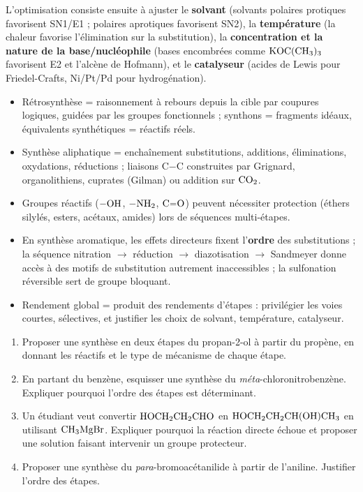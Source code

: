 \documentclass[11pt]{article}
\begin{document}
L'optimisation consiste ensuite à ajuster le \textbf{solvant} (solvants polaires protiques favorisent SN1/E1 ; polaires aprotiques favorisent SN2), la \textbf{température} (la chaleur favorise l'élimination sur la substitution), la \textbf{concentration et la nature de la base/nucléophile} (bases encombrées comme $\ce{KOC(CH3)3}$ favorisent E2 et l'alcène de Hofmann), et le \textbf{catalyseur} (acides de Lewis pour Friedel-Crafts, Ni/Pt/Pd pour hydrogénation).

\begin{aretenir}
\begin{itemize}
\item Rétrosynthèse = raisonnement à rebours depuis la cible par coupures logiques, guidées par les groupes fonctionnels ; synthons = fragments idéaux, équivalents synthétiques = réactifs réels.
\item Synthèse aliphatique = enchaînement substitutions, additions, éliminations, oxydations, réductions ; liaisons C$-$C construites par Grignard, organolithiens, cuprates (Gilman) ou addition sur $\ce{CO2}$.
\item Groupes réactifs ($-\ce{OH}$, $-\ce{NH2}$, $\ce{C=O}$) peuvent nécessiter protection (éthers silylés, esters, acétaux, amides) lors de séquences multi-étapes.
\item En synthèse aromatique, les effets directeurs fixent l'\textbf{ordre} des substitutions ; la séquence nitration $\rightarrow$ réduction $\rightarrow$ diazotisation $\rightarrow$ Sandmeyer donne accès à des motifs de substitution autrement inaccessibles ; la sulfonation réversible sert de groupe bloquant.
\item Rendement global = produit des rendements d'étapes : privilégier les voies courtes, sélectives, et justifier les choix de solvant, température, catalyseur.
\end{itemize}
\end{aretenir}

\begin{exercice}
\begin{enumerate}
\item Proposer une synthèse en deux étapes du propan-2-ol à partir du propène, en donnant les réactifs et le type de mécanisme de chaque étape.
\item En partant du benzène, esquisser une synthèse du \emph{méta}-chloronitrobenzène. Expliquer pourquoi l'ordre des étapes est déterminant.
\item Un étudiant veut convertir $\ce{HOCH2CH2CHO}$ en $\ce{HOCH2CH2CH(OH)CH3}$ en utilisant $\ce{CH3MgBr}$. Expliquer pourquoi la réaction directe échoue et proposer une solution faisant intervenir un groupe protecteur.
\item Proposer une synthèse du \emph{para}-bromoacétanilide à partir de l'aniline. Justifier l'ordre des étapes.
\end{enumerate}
\end{exercice}
\end{document}
